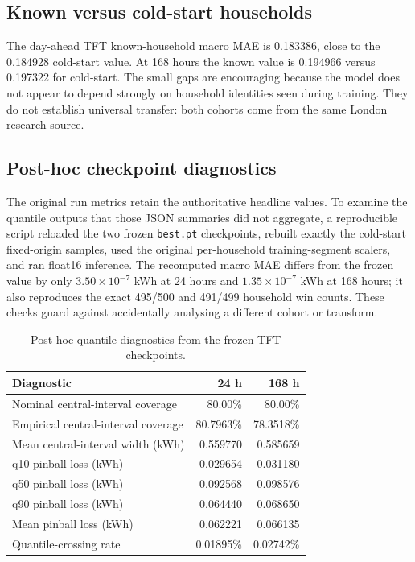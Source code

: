 \subsection{Known versus cold-start households}

The day-ahead TFT known-household macro MAE is 0.183386, close to the 0.184928 cold-start value. At 168 hours the known value is 0.194966 versus 0.197322 for cold-start. The small gaps are encouraging because the model does not appear to depend strongly on household identities seen during training. They do not establish universal transfer: both cohorts come from the same London research source.

\subsection{Post-hoc checkpoint diagnostics}

The original run metrics retain the authoritative headline values. To examine the quantile outputs that those JSON summaries did not aggregate, a reproducible script reloaded the two frozen \texttt{best.pt} checkpoints, rebuilt exactly the cold-start fixed-origin samples, used the original per-household training-segment scalers, and ran float16 inference. The recomputed macro MAE differs from the frozen value by only $3.50\times10^{-7}$ kWh at 24 hours and $1.35\times10^{-7}$ kWh at 168 hours; it also reproduces the exact 495/500 and 491/499 household win counts. These checks guard against accidentally analysing a different cohort or transform.

\begin{table}[H]
\centering
\caption{Post-hoc quantile diagnostics from the frozen TFT checkpoints.}
\label{tab:tftquantiles}
\begin{tabular}{lrr}
\toprule
Diagnostic & 24 h & 168 h \\
\midrule
Nominal central-interval coverage & 80.00\% & 80.00\% \\
Empirical central-interval coverage & 80.7963\% & 78.3518\% \\
Mean central-interval width (kWh) & 0.559770 & 0.585659 \\
q10 pinball loss (kWh) & 0.029654 & 0.031180 \\
q50 pinball loss (kWh) & 0.092568 & 0.098576 \\
q90 pinball loss (kWh) & 0.064440 & 0.068650 \\
Mean pinball loss (kWh) & 0.062221 & 0.066135 \\
Quantile-crossing rate & 0.01895\% & 0.02742\% \\
\bottomrule
\end{tabular}
\end{table}

